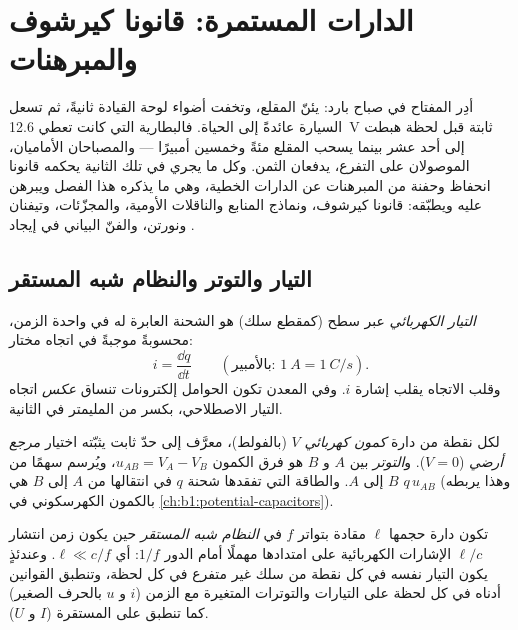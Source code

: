 \chapter{الدارات المستمرة: قانونا كيرشوف والمبرهنات}\label{ch:b1:dc-circuits}

أدِر المفتاح في صباح بارد: يئنّ المقلع، وتخفت أضواء لوحة القيادة
ثانيةً، ثم تسعل السيارة عائدةً إلى الحياة. فالبطارية التي كانت
تعطي \qty{12.6}{V} ثابتة قبل لحظة هبطت إلى أحد عشر بينما
يسحب المقلع مئةً وخمسين أمبيرًا --- والمصباحان الأماميان،
الموصولان على التفرع، يدفعان الثمن. وكل ما يجري في تلك الثانية يحكمه
قانونا انحفاظ وحفنة من المبرهنات عن الدارات الخطية،
وهي ما يذكره هذا الفصل ويبرهن عليه ويطبّقه: قانونا كيرشوف،
ونماذج المنابع والناقلات الأومية، والمجزّئات، وتيفنان ونورتن،
والفنّ البياني في إيجاد .

\section{التيار والتوتر والنظام شبه المستقر}

\begin{definition}\label{def:b1:dc-circuits:current}
\emph{التيار الكهربائي} عبر سطح (كمقطع سلك)
هو الشحنة العابرة له في واحدة الزمن، محسوبةً موجبةً في اتجاه
مختار:
\[
i = \frac{\dd q}{\dd t} \qquad (\text{بالأمبير: } \qty{1}{A} = \qty{1}{C/s}).
\]
وقلب الاتجاه يقلب إشارة $i$. وفي المعدن تكون
الحوامل إلكترونات تنساق \emph{عكس} اتجاه التيار
الاصطلاحي، بكسر من المليمتر في الثانية.
\end{definition}

\begin{definition}\label{def:b1:dc-circuits:voltage}
لكل نقطة من دارة \emph{كمون كهربائي} $V$ (بالفولط)،
معرَّف إلى حدّ ثابت يثبّته اختيار \emph{مرجع أرضي} ($V = 0$).
و\emph{التوتر} بين $A$ و $B$ هو فرق الكمون
$u_{AB} = V_A - V_B$، ويُرسم سهمًا من $B$ إلى $A$. والطاقة التي
تفقدها شحنة $q$ في انتقالها من $A$ إلى $B$ هي $q\,u_{AB}$ (وهذا يربطه
بالكمون الكهرسكوني في \cref{ch:b1:potential-capacitors}).
\end{definition}

\begin{definition}\label{def:b1:dc-circuits:arqs}
تكون دارة حجمها $\ell$ مقادة بتواتر $f$ في
\emph{النظام شبه المستقر} حين يكون زمن انتشار $\ell/c$
الإشارات الكهربائية على امتدادها مهملًا أمام الدور $1/f$:
أي $\ell \ll c/f$. وعندئذٍ يكون التيار نفسه في كل نقطة من
سلك غير متفرع في كل لحظة، وتنطبق القوانين أدناه في كل
لحظة على التيارات والتوترات المتغيرة مع الزمن ($i$ و $u$ بالحرف الصغير)
كما تنطبق على المستقرة ($I$ و $U$).
\end{definition}

